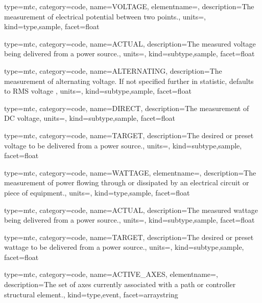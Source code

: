 {
  type=mtc,
  category=code,
  name={VOLTAGE},
  elementname=,
  description={The measurement of electrical potential between two points.},
  units=,
  kind={type,sample},
  facet={\gls{float}}
}


{
  type=mtc,
  category=code,
  name={ACTUAL},
  description={The measured voltage being delivered from a power source.},
  units=,
  kind={subtype,sample},
  facet={\gls{float}}
}


{
  type=mtc,
  category=code,
  name={ALTERNATING},
  description={The measurement of alternating voltage.   If not specified further in statistic, defaults to RMS voltage  },
  units=,
  kind={subtype,sample},
  facet={\gls{float}}
}


{
  type=mtc,
  category=code,
  name={DIRECT},
  description={The measurement of DC voltage},
  units=,
  kind={subtype,sample},
  facet={\gls{float}}
}


{
  type=mtc,
  category=code,
  name={TARGET},
  description={The desired or preset voltage to be delivered from a power source.},
  units=,
  kind={subtype,sample},
  facet={\gls{float}}
}


{
  type=mtc,
  category=code,
  name={WATTAGE},
  elementname=,
  description={The measurement of power flowing through or dissipated by an electrical circuit or piece of equipment.},
  units=,
  kind={type,sample},
  facet={\gls{float}}
}


{
  type=mtc,
  category=code,
  name={ACTUAL},
  description={The measured wattage being delivered from a power source.},
  units=,
  kind={subtype,sample},
  facet={\gls{float}}
}


{
  type=mtc,
  category=code,
  name={TARGET},
  description={The desired or preset wattage to be delivered from a power source.},
  units=,
  kind={subtype,sample},
  facet={\gls{float}}
}


{
  type=mtc,
  category=code,
  name={ACTIVE\_AXES},
  elementname=,
  description={The set of axes currently associated with a \gls{path} or \gls{controller} \gls{structural element}.},
  kind={type,event},
  facet={\gls{arraystring}}
}


